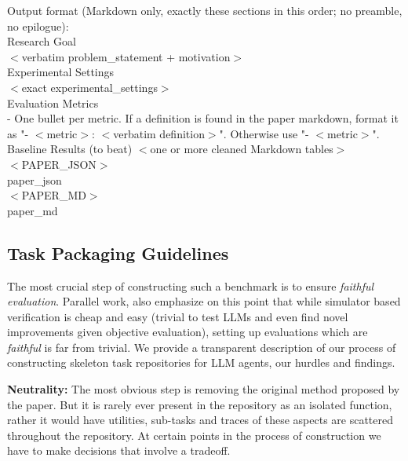 \documentclass[11pt]{article}
\theoremstyle{plain}
\theoremstyle{definition}
\theoremstyle{remark}
\begin{document}
\begin{tcolorbox}
Output format (Markdown only, exactly these sections in this order; no preamble, no epilogue):\\

Research Goal\\
$<$verbatim problem\_statement + motivation$>$\\

Experimental Settings\\
$<$exact experimental\_settings$>$\\

Evaluation Metrics\\
- One bullet per metric. If a definition is found in the paper markdown, format it as "- $<$metric$>$: $<$verbatim definition$>$". Otherwise use "- $<$metric$>$".\\

Baseline Results (to beat)
$<$one or more cleaned Markdown tables$>$\\

$<$PAPER\_JSON$>$\\

{{paper\_json}}\\

$<$PAPER\_MD$>$\\

{{paper\_md}}
\end{tcolorbox} \label{box:create-task-description}
\vspace{-6pt}

\subsection{Task Packaging Guidelines} \label{app:task-packaging-guidelines}

The most crucial step of constructing such a benchmark is to ensure \emph{faithful evaluation}. Parallel work, \citet{cheng2025barbariansgateaiupending} also emphasize on this point that while simulator based verification is cheap and easy (trivial to test LLMs and even find novel improvements given objective evaluation), setting up evaluations which are \emph{faithful} is far from trivial. We provide a transparent description of our process of constructing skeleton task repositories for LLM agents, our hurdles and findings.

\textbf{Neutrality:} The most obvious step is removing the original method proposed by the paper. But it is rarely ever present in the repository as an isolated function, rather it would have utilities, sub-tasks and traces of these aspects are scattered throughout the repository. At certain points in the process of construction we have to make decisions that involve a tradeoff.
\end{document}
